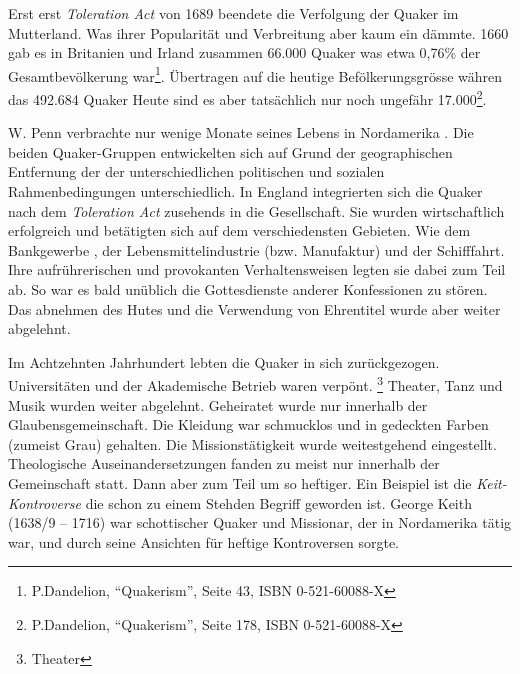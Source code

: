 \medskip

Erst erst \textit{Toleration Act}  von 1689 beendete die Verfolgung der Quaker im
Mutterland. Was ihrer Popularität und Verbreitung aber kaum ein dämmte.  1660 gab
es in Britanien  und Irland  zusammen 66.000 Quaker was etwa 0,76\% der
Gesamtbevölkerung war\footnote{P.Dandelion, "`Quakerism"', Seite 43, ISBN
0-521-60088-X}. Übertragen auf die heutige Befölkerungsgrösse währen das 492.684
Quaker Heute sind es aber tatsächlich nur noch ungefähr
17.000\footnote{P.Dandelion, "`Quakerism"', Seite 178, ISBN 0-521-60088-X}.

\medskip

W. Penn verbrachte nur wenige Monate seines Lebens in Nordamerika . Die beiden
Quaker-Gruppen entwickelten sich auf Grund der geographischen Entfernung der der
unterschiedlichen politischen und sozialen Rahmenbedingungen unterschiedlich. In
England integrierten sich die Quaker nach dem \textit{Toleration Act} zusehends
in die Gesellschaft. Sie wurden  wirtschaftlich erfolgreich und betätigten sich
auf dem verschiedensten Gebieten. Wie dem Bankgewerbe , der Lebensmittelindustrie 
(bzw. Manufaktur) und der Schifffahrt. Ihre aufrührerischen und provokanten
Verhaltensweisen legten sie dabei zum Teil ab. So war es bald unüblich die
Gottesdienste  anderer Konfessionen  zu stören. Das abnehmen des Hutes und die
Verwendung von Ehrentitel wurde aber weiter abgelehnt.

\medskip

Im Achtzehnten Jahrhundert lebten die Quaker in sich zurückgezogen.
Universitäten  und der Akademische Betrieb waren verpönt. \footnote{Theater} Theater, Tanz  und Musik 
wurden weiter abgelehnt. Geheiratet  wurde nur innerhalb der
Glaubensgemeinschaft. Die Kleidung  war schmucklos und in gedeckten Farben
(zumeist Grau) gehalten. Die Missionstätigkeit wurde weitestgehend eingestellt.
Theologische Auseinandersetzungen fanden zu meist nur innerhalb der Gemeinschaft
statt. Dann aber zum Teil um so heftiger. Ein Beispiel ist die
\textit{Keit-Kontroverse}  die schon zu einem Stehden Begriff geworden ist.
George Keith (1638/9 -- 1716)  war schottischer Quaker und Missionar, der in
Nordamerika tätig war, und durch seine Ansichten für heftige Kontroversen
sorgte. 

